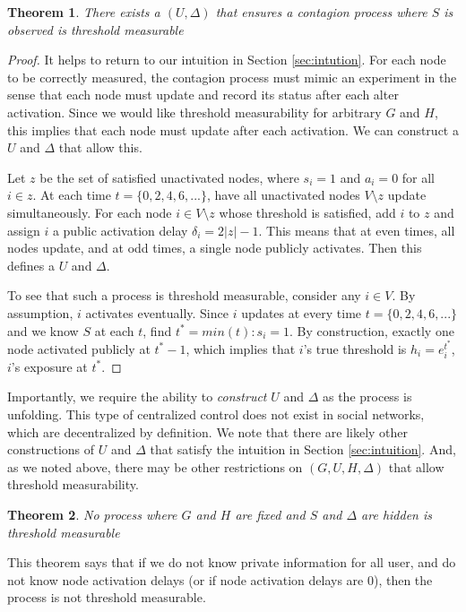 \documentclass[a4paper]{article}
\newtheorem{theorem}{Theorem}
\begin{document}
\begin{theorem} \label{theorem:fast}
There exists a $(U, \Delta)$ that ensures a contagion process where $S$ is observed is threshold measurable
\end{theorem}

\begin{proof}
It helps to return to our intuition in Section \ref{sec:intution}. For each node to be correctly measured, the contagion process must mimic an experiment in the sense that each node must update and record its status after each alter activation. Since we would like threshold measurability for arbitrary $G$ and $H$, this implies that each node must update after each activation. We can construct a $U$ and $\Delta$ that allow this.

Let $z$ be the set of satisfied unactivated nodes, where $s_i = 1$ and $a_i = 0$ for all $i \in z$. At each time $t = \{0, 2, 4, 6, ...\}$, have all unactivated nodes $V \setminus z$ update simultaneously. For each node $i \in V \setminus z$ whose threshold is satisfied, add $i$ to $z$ and assign $i$ a public activation delay $\delta_i = 2|z| - 1$. This means that at even times, all nodes update, and at odd times, a single node publicly activates. Then this defines a $U$ and $\Delta$.

To see that such a process is threshold measurable, consider any $i \in V$. By assumption, $i$ activates eventually. Since $i$ updates at every time $t = \{0, 2, 4, 6, ...\}$ and we know $S$ at each $t$, find $t^* = min(t) : s_i = 1$. By construction, exactly one node activated publicly at $t^* - 1$, which implies that $i$'s true threshold is $h_i = e_i^{t^*}$, $i$'s exposure at $t^*$.
\end{proof}

\noindent
Importantly, we require the ability to \emph{construct} $U$ and $\Delta$ as the process is unfolding. This type of centralized control does not exist in social networks, which are decentralized by definition. We note that there are likely other constructions of $U$ and $\Delta$ that satisfy the intuition in Section \ref{sec:intuition}. And, as we noted above, there may be other restrictions on $(G, U, H, \Delta)$ that allow threshold measurability.

\begin{theorem} \label{theorem:public}
No process where $G$ and $H$ are fixed and $S$ and $\Delta$ are hidden is threshold measurable
\end{theorem}

This theorem says that if we do not know private information for all user, and do not know node activation delays (or if node activation delays are 0), then the process is not threshold measurable.
\end{document}
